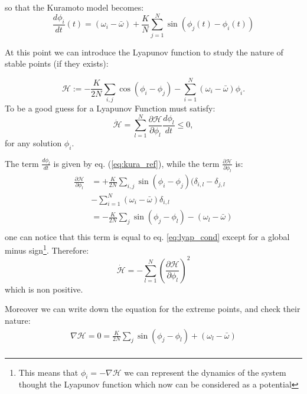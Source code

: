 so that the Kuramoto model becomes:
\begin{equation}
  \frac{d \phi_i}{d t}(t)=\left(\omega_i-\bar{\omega}\right)+\frac{K}{N} \sum_{j=1}^N \sin \left(\phi_j(t)-\phi_i(t)\right)  
  \label{eq:kura_ref}
\end{equation}

At this point we can introduce the Lyapunov function to study the nature of stable points (if they exists):

\begin{equation}
\mathcal{H}:=-\frac{K}{2 N} \sum_{i, j} \cos \left(\phi_i-\phi_j\right)-\sum_{i=1}^N\left(\omega_i-\bar{\omega}\right) \phi_i.
\label{eq:lyapunov}
\end{equation}
To be a good guess for a Lyapunov Function must satisfy:
\begin{equation}
\dot{\mathcal{H}}=\sum_{l=1}^N \frac{\partial \mathcal{H}}{\partial \phi_l} \frac{d \phi_l}{d t} \leq 0, 
\label{eq:lyap_cond}
\end{equation}
for any solution $\phi_i$. 


The term $\frac{d \phi_l}{d t}$ is given by eq. (\ref{eq:kura_ref}), while the term $\frac{\partial \mathcal{H}}{\partial \phi_l}$ is: 
\begin{align*}
    \frac{\partial \mathcal{H}}{\partial \phi_l} &= +\frac{K}{2 N} \sum_{i, j} \sin \left(\phi_i-\phi_j\right) (\delta_{i,l} - \delta_{j,l}\\
    &-\sum_{i=1}^N\left(\omega_i-\bar{\omega}\right) \delta_{i,l} \\
    &= -\frac{K}{2 N} \sum_{j} \sin \left(\phi_j-\phi_l\right)-\left(\omega_l-\bar{\omega}\right)\\
\end{align*}
one can notice that this term is equal to eq. \ref{eq:lyap_cond} except for a global minus sign\footnote{This means that $\phi_i = -\nabla \mathcal{H}$ we can represent the dynamics of the system thought the Lyapunov function which now can be considered as a potential }. 
Therefore:
\begin{equation*}
    \dot{\mathcal{H}}=-\sum_{l=1}^N \left(\frac{\partial \mathcal{H}}{\partial \phi_l}\right)^2  
\end{equation*}
which is non positive. 

Moreover we can write down the equation for the extreme points, and check their nature:
\begin{align*}
    \nabla \mathcal{H} = 0 = \frac{K}{2 N} \sum_{j} \sin \left(\phi_j-\phi_l\right)+\left(\omega_l-\bar{\omega}\right)\\
\end{align*}


